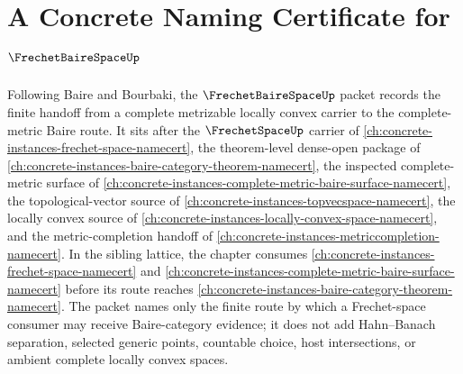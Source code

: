 \chapter{A Concrete Naming Certificate for $\FrechetBaireSpaceUp$}
\label{ch:concrete-instances-frechet-baire-space-namecert}

Following Baire and Bourbaki, the $\FrechetBaireSpaceUp$ packet records the finite handoff from a complete metrizable locally convex carrier to the complete-metric Baire route. It sits after the $\FrechetSpaceUp$ carrier of \autoref{ch:concrete-instances-frechet-space-namecert}, the theorem-level dense-open package of \autoref{ch:concrete-instances-baire-category-theorem-namecert}, the inspected complete-metric surface of \autoref{ch:concrete-instances-complete-metric-baire-surface-namecert}, the topological-vector source of \autoref{ch:concrete-instances-topvecspace-namecert}, the locally convex source of \autoref{ch:concrete-instances-locally-convex-space-namecert}, and the metric-completion handoff of \autoref{ch:concrete-instances-metriccompletion-namecert}. In the sibling lattice, the chapter consumes \autoref{ch:concrete-instances-frechet-space-namecert} and \autoref{ch:concrete-instances-complete-metric-baire-surface-namecert} before its route reaches \autoref{ch:concrete-instances-baire-category-theorem-namecert}. The packet names only the finite route by which a Frechet-space consumer may receive Baire-category evidence; it does not add Hahn--Banach separation, selected generic points, countable choice, host intersections, or ambient complete locally convex spaces.


